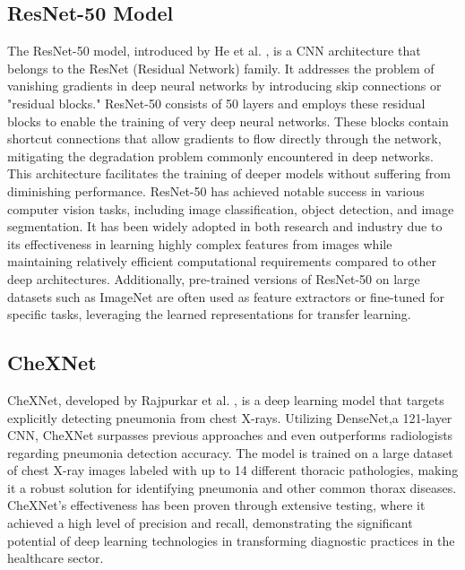 \documentclass[10pt]{article}
\begin{document}
\subsection{ResNet-50 Model}
The ResNet-50 model, introduced by He et al. \cite{He2016} \cite{Manickam2021}, is a CNN architecture that belongs to the ResNet (Residual Network) family. It addresses the problem of vanishing gradients in deep neural networks by introducing skip connections or "residual blocks." ResNet-50 consists of 50 layers and employs these residual blocks to enable the training of very deep neural networks. These blocks contain shortcut connections that allow gradients to flow directly through the network, mitigating the degradation problem commonly encountered in deep networks. This architecture facilitates the training of deeper models without suffering from diminishing performance. ResNet-50 has achieved notable success in various computer vision tasks, including image classification, object detection, and image segmentation. It has been widely adopted in both research and industry due to its effectiveness in learning highly complex features from images while maintaining relatively efficient computational requirements compared to other deep architectures. Additionally, pre-trained versions of ResNet-50 on large datasets such as ImageNet are often used as feature extractors or fine-tuned for specific tasks, leveraging the learned representations for transfer learning.

\subsection{CheXNet}
CheXNet, developed by Rajpurkar et al. \cite{Rajpurkar2017}, is a deep learning model that targets explicitly detecting pneumonia from chest X-rays. Utilizing DenseNet,a 121-layer CNN, CheXNet surpasses previous approaches and even outperforms radiologists regarding pneumonia detection accuracy. The model is trained on a large dataset of chest X-ray images labeled with up to 14 different thoracic pathologies, making it a robust solution for identifying pneumonia and other common thorax diseases. CheXNet's effectiveness has been proven through extensive testing, where it achieved a high level of precision and recall, demonstrating the significant potential of deep learning technologies in transforming diagnostic practices in the healthcare sector.
\end{document}
